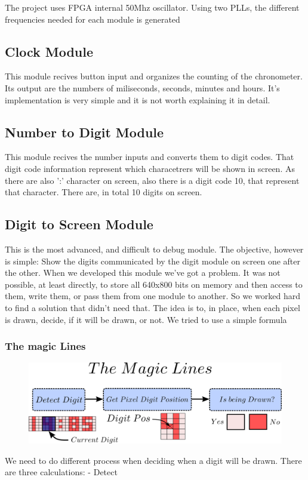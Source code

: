 The project uses FPGA internal 50Mhz oscillator. Using two PLLs, the different frequencies needed for each module is generated

\subsection*{Clock Module}

This module recives button input and organizes the counting of the chronometer.
Its output are the numbers of miliseconds, seconds, minutes and hours.
It's implementation is very simple and it is not worth explaining it in detail.

\subsection*{Number to Digit Module}

This module recives the number inputs and converts them to digit codes. That digit code information represent which characetrers will be shown in screen. As there are also ':' character on screen, also there is a digit code 10, that represent that character.
There are, in total 10 digits on screen.

\subsection*{Digit to Screen Module}
This is the most advanced, and difficult to debug module. The objective, however is simple: Show the digits communicated by the digit module on screen one after the other.
When we developed this module we've got a problem. It was not possible, at least directly, to store all 640x800 bits on memory and then access to them, write them, or pass them from one module to another. So we worked hard to find a solution that didn't need that.
The idea is to, in place, when each pixel is drawn, decide, if it will be drawn, or not. We tried to use a simple formula 

\subsubsection*{The magic Lines}
\begin{figure}[htbp]
    \begin{center}
    \includegraphics[scale=0.8]{dibujos/digitpng.png}
    
    \end{center}
    
    \label{fig:Pll}
    \end{figure}

We need to do different process when deciding when a digit will be drawn. There are three calculations:
- Detect



